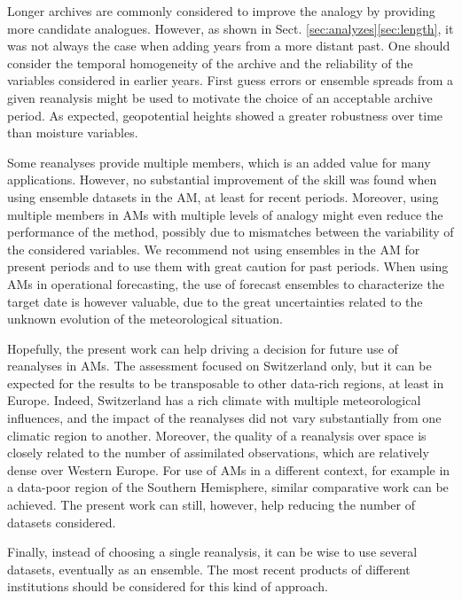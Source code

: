 \documentclass{ametsoc}
\begin{document}
Longer archives are commonly considered to improve the analogy by providing more candidate analogues. However, as shown in Sect. \ref{sec:analyzes}\ref{sec:length}, it was not always the case when adding years from a more distant past. One should consider the temporal homogeneity of the archive and the reliability of the variables considered in earlier years. First guess errors or ensemble spreads from a given reanalysis might be used to motivate the choice of an acceptable archive period. As expected, geopotential heights showed a greater robustness over time than moisture variables. 

Some reanalyses provide multiple members, which is an added value for many applications. However, no substantial improvement of the skill was found when using ensemble datasets in the AM, at least for recent periods. Moreover, using multiple members in AMs with multiple levels of analogy might even reduce the performance of the method, possibly due to mismatches between the variability of the considered variables. We recommend not using ensembles in the AM for present periods and to use them with great caution for past periods. When using AMs in operational forecasting, the use of forecast ensembles to characterize the target date is however valuable, due to the great uncertainties related to the unknown evolution of the meteorological situation.

Hopefully, the present work can help driving a decision for future use of reanalyses in AMs. The assessment focused on Switzerland only, but it can be expected for the results to be transposable to other data-rich regions, at least in Europe. Indeed, Switzerland has a rich climate with multiple meteorological influences, and the impact of the reanalyses did not vary substantially from one climatic region to another. Moreover, the quality of a reanalysis over space is closely related to the number of assimilated observations, which are relatively dense over Western Europe. For use of AMs in a different context, for example in a data-poor region of the Southern Hemisphere, similar comparative work can be achieved. The present work can still, however, help reducing the number of datasets considered.

Finally, instead of choosing a single reanalysis, it can be wise to use several datasets, eventually as an ensemble. The most recent products of different institutions should be considered for this kind of approach.
\end{document}
